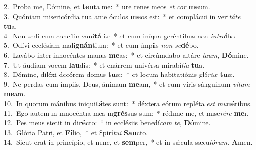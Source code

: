 {2.~}Proba me, Dómine, et \textbf{ten}ta me:~* ure renes meos \textit{et} \textit{cor} \textbf{me}um.\\
{3.~}Quóniam misericórdia tua ante óculos \textbf{me}os est:~* et complácui in veri\textit{tá}\textit{te} \textbf{tu}a.\\
{4.~}Non sedi cum concílio vani\textbf{tá}tis:~* et cum iníqua geréntibus non \textit{in}\textit{tro}\textbf{í}bo.\\
{5.~}Odívi ecclésiam mali\textbf{gnán}tium:~* et cum ímpiis \textit{non} \textit{se}\textbf{dé}bo.\\
{6.~}Lavábo inter innocéntes manus \textbf{me}as:~* et circúmdabo altáre \textit{tu}\textit{um}, \textbf{Dó}mine.\\
{7.~}Ut áudiam vocem \textbf{lau}dis:~* et enárrem univérsa mirabí\textit{li}\textit{a} \textbf{tu}a.\\
{8.~}Dómine, diléxi decórem domus \textbf{tu}æ:~* et locum habitatiónis gló\textit{ri}\textit{æ} \textbf{tu}æ.\\
{9.~}Ne perdas cum ímpiis, Deus, ánimam \textbf{me}am,~* et cum viris sánguinum \textit{vi}\textit{tam} \textbf{me}am.\\
{10.~}In quorum mánibus iniqui\textbf{tá}tes sunt:~* déxtera eórum repléta \textit{est} \textit{mu}\textbf{né}ribus.\\
{11.~}Ego autem in innocéntia mea in\textbf{grés}sus sum:~* rédime me, et mise\textit{ré}\textit{re} \textbf{me}i.\\
{12.~}Pes meus stetit in di\textbf{ré}cto:~* in ecclésiis benedí\textit{cam} \textit{te}, \textbf{Dó}mine.\\
{13.~}Glória Patri, et \textbf{Fí}lio,~* et Spirí\textit{tu}\textit{i} \textbf{San}cto.\\
{14.~}Sicut erat in princípio, et nunc, et \textbf{sem}per,~* et in sǽcula sæcu\textit{ló}\textit{rum}. \textbf{A}men.\\
